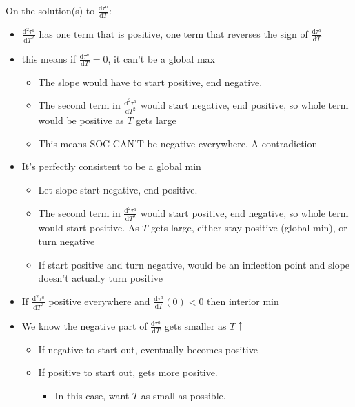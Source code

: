 \documentclass[12pt]{article}
\begin{document}
\newpage
On the solution(s) to $\frac{\mathrm{d} \tau^a}{\mathrm{d} T}$:
\begin{itemize}
	\item $\frac{\mathrm{d}^2 \tau^a}{\mathrm{d} T^2}$ has one term that is positive, one term that reverses the sign of $\frac{\mathrm{d} \tau^a}{\mathrm{d} T}$
	\item this means if $\frac{\mathrm{d} \tau^a}{\mathrm{d} T} =0$, it can't be a global max
		\begin{itemize}
			\item The slope would have to start positive, end negative.
			\item The second term in $\frac{\mathrm{d}^2 \tau^a}{\mathrm{d} T^2}$ would start negative, end positive, so whole term would be positive as $T$ gets large
			\item This means SOC CAN'T be negative everywhere. A contradiction
		\end{itemize}
	\item It's perfectly consistent to be a global min
		\begin{itemize}
			\item Let slope start negative, end positive.
			\item The second term in $\frac{\mathrm{d}^2 \tau^a}{\mathrm{d} T^2}$ would start positive, end negative, so whole term would start positive. As $T$ gets large, either stay positive (global min), or turn negative
			\item If start positive and turn negative, would be an inflection point and slope doesn't actually turn positive
		\end{itemize}
	\item If $\frac{\mathrm{d}^2 \tau^a}{\mathrm{d} T^2}$ positive everywhere and $\frac{\mathrm{d} \tau^a}{\mathrm{d} T}\left(0\right) < 0$ then interior min
	\item We know the negative part of $\frac{\mathrm{d} \tau^a}{\mathrm{d} T}$ gets smaller as $T \uparrow$
		\begin{itemize}
			\item If negative to start out, eventually becomes positive
			\item If positive to start out, gets more positive. 
				\begin{itemize}
					\item In this case, want $T$ as small as possible.
				\end{itemize}
		\end{itemize}
\end{itemize}
		
\end{document}
